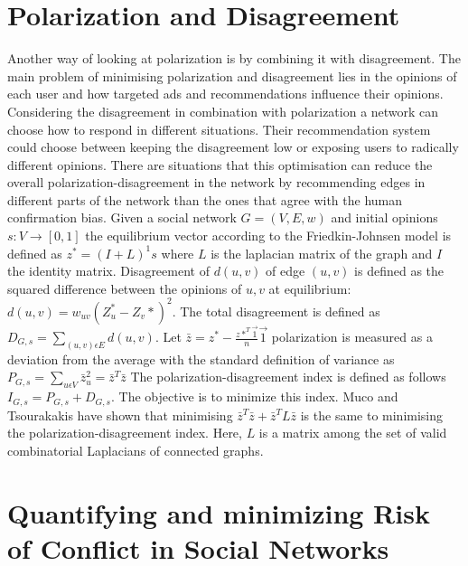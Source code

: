 \section{Polarization and Disagreement}
\label{sec:polarizationDisareement}

Another way of looking at polarization is by combining it with disagreement. The main problem of minimising polarization and disagreement lies in the opinions of each user and how targeted ads and recommendations influence their opinions. Considering the disagreement in combination with polarization a network can choose how to respond in different situations. Their recommendation system could choose between keeping the disagreement low or exposing users to radically different opinions. There are situations that this optimisation can reduce the overall polarization-disagreement in the network by recommending edges in different parts of the network than the ones that agree with the human confirmation bias. Given a social network $G = (V,E,w)$ and initial opinions $s: V \rightarrow [0,1]$ the equilibrium vector according to the Friedkin-Johnsen model is defined as $z^*=(I+L)^1s$ where $L$ is the laplacian matrix of the graph and $I$ the identity matrix. Disagreement of $d(u,v)$ of edge $(u,v)$ is defined as the squared difference between the opinions of $u,v$ at equilibrium: $d(u,v) = w_{uv}(Z_u^* - Z_v*)^2.$ The total disagreement is defined as $D_{G,s} = \sum_{(u,v) \epsilon E} d(u,v)$. Let $\bar z = z^* - \frac{z*^T \overrightarrow 1}{n}\overrightarrow 1$ polarization is measured as a deviation from the average with the standard definition of variance as $P_{G,s} = \sum_{u\epsilon V} \bar z_u^2 = \bar z^T \bar z$ The polarization-disagreement index is defined as follows $I_{G,s} = P_{G,s} +D_{G,s}$. The objective is to minimize this index. Muco and Tsourakakis have shown that minimising $\bar z^T \bar z + \bar z^T L\bar z$ is the same to minimising the polarization-disagreement index. Here, $L$ is a matrix among the set of valid combinatorial Laplacians of connected graphs.\cite{musco}

\section{Quantifying and minimizing Risk of Conflict in Social Networks}
\label{sec:riskOfConflict}

